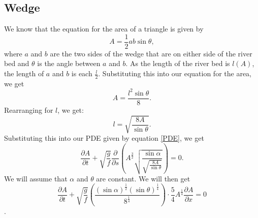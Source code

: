 \documentclass[12pt]{article}
\begin{document}
\subsection{Wedge}
We know that the equation for the area of a triangle is given by 
\begin{equation}
    A = \frac{1}{2}ab\sin\theta,
\end{equation}
where $a$ and $b$ are the two sides of the wedge that are on either side of the river bed and $\theta$ is the angle between $a$ and $b$.  As the length of the river bed is $l(A)$, the length of $a$ and $b$ is each $\frac{l}{2}$.  Substituting this into our equation for the area, we get
\begin{equation}
    A = \frac{l^2\sin\theta}{8}.
\end{equation}
Rearranging for $l$, we get:
\begin{equation}
    l = \sqrt{\frac{8A}{\sin\theta}}.
\end{equation}
Substituting this into our PDE given by equation \ref{PDE}, we get
\begin{equation}
    \frac{\partial A}{\partial t} + \sqrt{\frac{g}{f}}\frac{\partial}{\partial s}\left(A^{\frac{3}{2}}\sqrt{\frac{\sin\alpha}{\sqrt{\frac{8A}{\sin\theta}}}}\right) = 0.
\end{equation}
We will assume that $\alpha$ and $\theta$ are constant.  We will then get
\begin{equation}
    \frac{\partial A}{\partial t} + \sqrt{\frac{g}{f}}\left(\frac{(\sin\alpha)^{\frac{1}{2}}(\sin\theta)^{\frac{1}{4}}}{8^{\frac{1}{4}}}\right) \cdot \frac{5}{4}A^{\frac{1}{4}}\frac{\partial A}{\partial x} = 0
\end{equation}.
\end{document}
